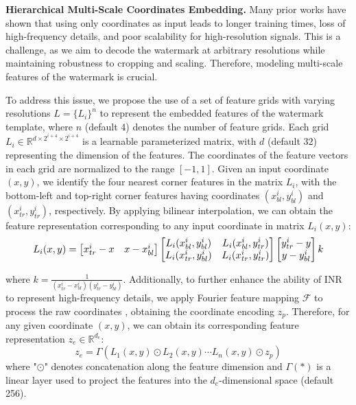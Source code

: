 \documentclass{article}
\begin{document}
\textbf{Hierarchical Multi-Scale Coordinates Embedding.} Many prior works \cite{muller2022instant, girish2023shacira} have shown that using only coordinates as input leads to longer training times, loss of high-frequency details, and poor scalability for high-resolution signals. This is a challenge, as we aim to decode the watermark at arbitrary resolutions while maintaining robustness to cropping and scaling. Therefore, modeling multi-scale features of the watermark is crucial.

To address this issue, we propose the use of a set of feature grids with varying resolutions $L=\{L_i\}^n$ to represent the embedded features of the watermark template, where $n$ (default 4) denotes the number of feature grids.
Each grid $L_i\in\mathbb{R}^{d\times 2^{i+4} \times 2^{i+4}}$ is a learnable parameterized matrix, with $d$ (default $32$) representing the dimension of the features. The coordinates of the feature vectors in each grid are normalized to the range $[-1, 1]$. 
Given an input coordinate \( (x, y) \), we identify the four nearest corner features in the matrix \( L_i \), with the bottom-left and top-right corner features having coordinates \( (x_{bl}^i, y_{bl}^i) \) and \( (x_{tr}^i, y_{tr}^i) \), respectively. By applying bilinear interpolation, we can obtain the feature representation corresponding to any input coordinate in matrix \( L_i(x,y) \):
\begin{equation}
    \resizebox{0.9\hsize}{!}{
    $L_{i}(x,y)=\begin{bmatrix}
  x_{tr}^i-x& x-x_{bl}^i
\end{bmatrix}\begin{bmatrix}
  L_i(x_{bl}^i,y_{bl}^i)& L_i(x_{bl}^i,y_{tr}^i) \\
  L_i(x_{tr}^i,y_{bl}^i)& L_i(x_{tr}^i,y_{tr}^i)
\end{bmatrix}\begin{bmatrix}
 y_{tr}^i-y\\
y-y_{bl}^i
\end{bmatrix}k$
}
\end{equation}

where $k=\frac{1}{(x_{tr}^i-x_{bl}^i)(y_{tr}^i-y_{bl}^i)}$. Additionally, to further enhance the ability of INR to represent high-frequency details, we apply Fourier feature mapping $\mathcal{F}$ to process the raw coordinates \cite{tancik2020fourier}, obtaining the coordinate encoding $z_p$. Therefore, for any given coordinate $(x, y)$, we can obtain its corresponding feature representation $z_e\in \mathbb{R}^{d_e}$:
\begin{equation}
    z_e=\Gamma(L_1(x,y)\odot L_{2}(x,y)\cdots L_n(x,y)\odot z_p) 
\end{equation}
where "$\odot$" denotes concatenation along the feature dimension and $\Gamma(*)$ is a linear layer used to project the features into the $d_e$-dimensional space (default 256).
\end{document}
